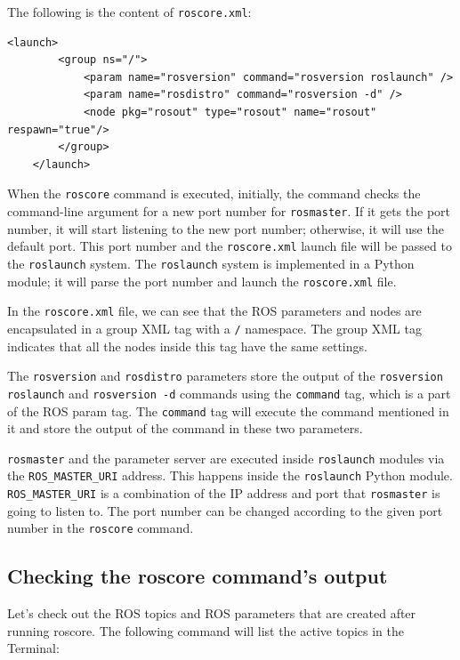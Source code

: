 \documentclass[../../main]{subfiles}
\begin{document}
The following is the content of \texttt{roscore.xml}:

\begin{lstlisting}[style=xmlstyle]
    <launch>
        <group ns="/">
            <param name="rosversion" command="rosversion roslaunch" />
            <param name="rosdistro" command="rosversion -d" />
            <node pkg="rosout" type="rosout" name="rosout" respawn="true"/>
        </group>
    </launch>
\end{lstlisting}

When the \texttt{roscore} command is executed, initially, the command checks the command-line argument for a new port number for \texttt{rosmaster}. If it gets the port number, it will start listening to the new port number; otherwise, it will use the default port. This port number and the \texttt{roscore.xml} launch file will be passed to the \texttt{roslaunch} system. The \texttt{roslaunch} system is implemented in a Python module; it will parse the port number and launch the \texttt{roscore.xml} file.

In the \texttt{roscore.xml} file, we can see that the ROS parameters and nodes are encapsulated in a group XML tag with a \texttt{/} namespace. The group XML tag indicates that all the nodes inside this tag have the same settings.


The \texttt{rosversion} and \texttt{rosdistro} parameters store the output of the \texttt{rosversion roslaunch} and \texttt{rosversion -d} commands using the \texttt{command} tag, which is a part of the ROS param tag. The \texttt{command} tag will execute the command mentioned in it and store the output of the command in these two parameters.

\texttt{rosmaster} and the parameter server are executed inside \texttt{roslaunch} modules via the \texttt{ROS\_MASTER\_URI} address. This happens inside the \texttt{roslaunch} Python module.\\ \texttt{ROS\_MASTER\_URI} is a combination of the IP address and port that \texttt{rosmaster} is going to listen to. The port number can be changed according to the given port number in the \texttt{roscore} command.
\newpage
\subsection{Checking the roscore command's output}
Let's check out the ROS topics and ROS parameters that are created after running roscore. The following command will list the active topics in the Terminal:
\end{document}
